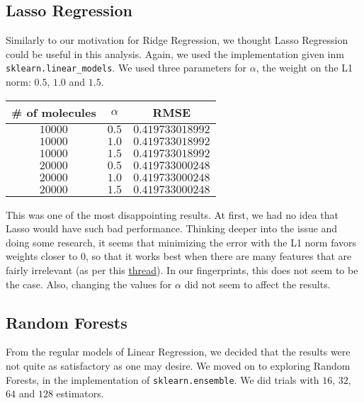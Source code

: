 \documentclass[10pt]{article}
\begin{document}
\subsection{Lasso Regression}

Similarly to our motivation for Ridge Regression, we thought Lasso Regression
could be useful in this analysis. Again, we used the implementation given
inm \verb|sklearn.linear_models|. We used three parameters for $\alpha$, the
weight on the L1 norm: $0.5$, $1.0$ and $1.5$.

\medskip

\begin{center}

\begin{tabular}[center]{|c|c|c|}
\hline
\# of molecules & $\alpha$ & RMSE \\
\hline
$10000$ & $0.5$ & $0.419733018992$ \\
\hline 
$10000$ & $1.0$ & $0.419733018992$ \\
\hline 
$10000$ & $1.5$ & $0.419733018992$ \\
\hline
$20000$ & $0.5$ & $0.419733000248$ \\
\hline 
$20000$ & $1.0$ & $0.419733000248$ \\
\hline 
$20000$ & $1.5$ & $0.419733000248$ \\
\hline
\end{tabular}

\end{center}

\medskip

This was one of the most disappointing results. At first, we had no idea that
Lasso would have such bad performance. Thinking deeper into the issue and 
doing some research, it seems that minimizing the error with the L1 norm favors
weights closer to $0$, so that it works best when there are many features
that are fairly irrelevant (as per this \href{http://stats.stackexchange.com/questions/866/when-should-i-use-lasso-vs-ridge}{thread}).
In our fingerprints, this does not seem to be the case. Also, changing the
values for $\alpha$ did not seem to affect the results.

\subsection{Random Forests}

From the regular models of Linear Regression, we decided that the results
were not quite as satisfactory as one may desire. We moved on to exploring
Random Forests, in the implementation of \verb|sklearn.ensemble|. We did
trials with $16$, $32$, $64$ and $128$ estimators.
\end{document}
